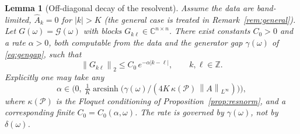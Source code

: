 \documentclass{amsart}
\newtheorem{lemma}{Lemma}
\theoremstyle{definition}
\newcommand{\C}{\mathbb{C}}
\newcommand{\Z}{\mathbb{Z}}
\newcommand{\norm}[1]{\left\lVert#1\right\rVert}
\begin{document}
\begin{lemma}[Off-diagonal decay of the resolvent]\label{lem:decay}
Assume the data are \emph{band-limited}, $\hat A_k=0$ for $|k|>K$ (the general
case is treated in Remark~\ref{rem:general}). Let
$G(\omega)=\mathcal G(\omega)$ with blocks $G_{k\ell}\in\C^{n\times n}$. There
exist constants $C_0>0$ and a rate $\alpha>0$, both computable from the data
and the \emph{generator gap} $\gamma(\omega)$ of \eqref{eq:gengap}, such that
\begin{equation}\label{eq:decay}
\norm{G_{k\ell}}_2\le C_0\,e^{-\alpha|k-\ell|},\qquad k,\ell\in\Z .
\end{equation}
Explicitly one may take any
\begin{equation}\label{eq:alpharange}
\alpha\in\Big(0,\ \tfrac1K\operatorname{arcsinh}\!\big(\gamma(\omega)/(4K\,\kappa(\mathcal P)\,\norm{A}_{L^\infty})\big)\Big),
\end{equation}
where $\kappa(\mathcal P)$ is the Floquet conditioning of
Proposition~\ref{prop:resnorm}, and a corresponding finite $C_0=C_0(\alpha,\omega)$.
The rate is governed by $\gamma(\omega)$, \emph{not} by $\delta(\omega)$.
\end{lemma}
\end{document}
